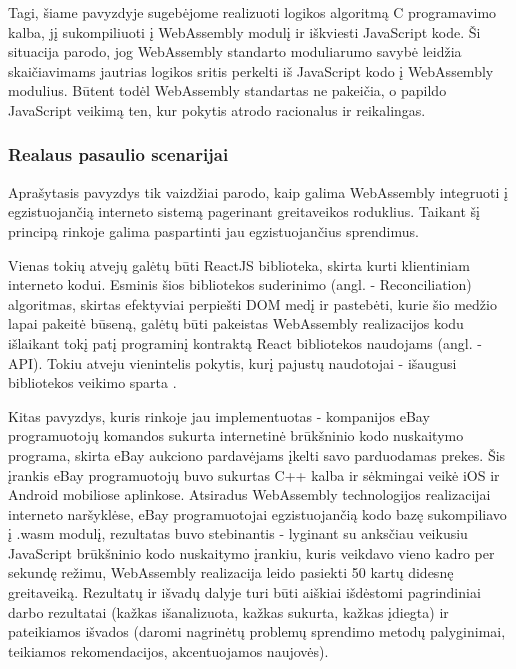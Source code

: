 \documentclass{VUMIFPSkursinis}
\begin{document}
Tagi, šiame pavyzdyje sugebėjome realizuoti logikos algoritmą C programavimo kalba, jį sukompiliuoti į WebAssembly modulį ir iškviesti JavaScript kode. Ši situacija parodo, jog WebAssembly standarto moduliarumo savybė leidžia skaičiavimams jautrias logikos sritis perkelti iš JavaScript kodo į WebAssembly modulius. Būtent todėl WebAssembly standartas ne pakeičia, o papildo JavaScript veikimą ten, kur pokytis atrodo racionalus ir reikalingas.

\subsubsection{Realaus pasaulio scenarijai}

Aprašytasis pavyzdys tik vaizdžiai parodo, kaip galima WebAssembly integruoti į egzistuojančią interneto sistemą pagerinant greitaveikos roduklius. Taikant šį principą rinkoje galima paspartinti jau egzistuojančius sprendimus.

Vienas tokių atvejų galėtų būti ReactJS biblioteka, skirta kurti klientiniam interneto kodui. Esminis šios bibliotekos suderinimo (angl. - Reconciliation) algoritmas, skirtas efektyviai perpiešti DOM medį ir pastebėti, kurie šio medžio lapai pakeitė būseną, galėtų būti pakeistas WebAssembly realizacijos kodu išlaikant tokį patį programinį kontraktą React bibliotekos naudojams (angl. - API). Tokiu atveju vienintelis pokytis, kurį pajustų naudotojai - išaugusi bibliotekos veikimo sparta .

Kitas pavyzdys, kuris rinkoje jau implementuotas - kompanijos eBay programuotojų komandos sukurta internetinė brūkšninio kodo nuskaitymo programa, skirta eBay aukciono pardavėjams įkelti savo parduodamas prekes. Šis įrankis eBay programuotojų buvo sukurtas C++ kalba ir sėkmingai veikė iOS ir Android mobiliose aplinkose. Atsiradus WebAssembly technologijos realizacijai interneto naršyklėse, eBay programuotojai egzistuojančią kodo bazę sukompiliavo į .wasm modulį, rezultatas buvo stebinantis - lyginant su anksčiau veikusiu JavaScript brūkšninio kodo nuskaitymo įrankiu, kuris veikdavo vieno kadro per sekundę režimu, WebAssembly realizacija leido pasiekti 50 kartų didesnę greitaveiką.
Rezultatų ir išvadų dalyje turi būti aiškiai išdėstomi pagrindiniai darbo
rezultatai (kažkas išanalizuota, kažkas sukurta, kažkas įdiegta) ir pateikiamos
išvados (daromi nagrinėtų problemų sprendimo metodų palyginimai, teikiamos
rekomendacijos, akcentuojamos naujovės).


\printbibliography[heading=bibintoc, title=Šaltiniai]  %
\end{document}
